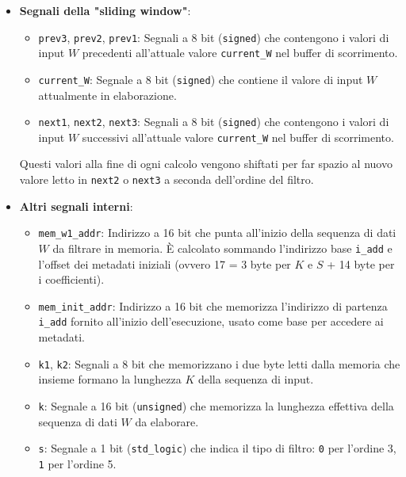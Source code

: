 \documentclass{article}
\begin{document}
\begin{itemize}
    \item \textbf{Segnali della "sliding window"}:
    \begin{itemize}
        \item \texttt{prev3}, \texttt{prev2}, \texttt{prev1}: Segnali a 8 bit (\texttt{signed}) che contengono i valori di input $W$ precedenti all'attuale valore \texttt{current\_W} nel buffer di scorrimento.
        \item \texttt{current\_W}: Segnale a 8 bit (\texttt{signed}) che contiene il valore di input $W$ attualmente in elaborazione.
        \item \texttt{next1}, \texttt{next2}, \texttt{next3}: Segnali a 8 bit (\texttt{signed}) che contengono i valori di input $W$ successivi all'attuale valore \texttt{current\_W} nel buffer di scorrimento.
    \end{itemize}
    Questi valori alla fine di ogni calcolo vengono shiftati per far spazio al nuovo valore letto in \texttt{next2} o \texttt{next3} a seconda dell'ordine del filtro.

    \item \textbf{Altri segnali interni}:
    \begin{itemize}
        \item \texttt{mem\_w1\_addr}: Indirizzo a 16 bit che punta all'inizio della sequenza di dati $W$ da filtrare in memoria. È calcolato sommando l'indirizzo base \texttt{i\_add} e l'offset dei metadati iniziali (ovvero 17 = 3 byte per $K$ e $S$ + 14 byte per i coefficienti).
        \item \texttt{mem\_init\_addr}: Indirizzo a 16 bit che memorizza l'indirizzo di partenza \texttt{i\_add} fornito all'inizio dell'esecuzione, usato come base per accedere ai metadati.
        \item \texttt{k1}, \texttt{k2}: Segnali a 8 bit che memorizzano i due byte letti dalla memoria che insieme formano la lunghezza $K$ della sequenza di input.
        \item \texttt{k}: Segnale a 16 bit (\texttt{unsigned}) che memorizza la lunghezza effettiva della sequenza di dati $W$ da elaborare.
        \item \texttt{s}: Segnale a 1 bit (\texttt{std\_logic}) che indica il tipo di filtro: \texttt{0} per l'ordine 3, \texttt{1} per l'ordine 5.
    \end{itemize}
    
\end{itemize}
\end{document}
